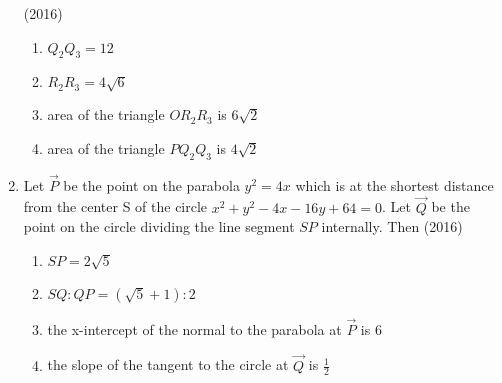 \begin{enumerate}
	      \hfill(2016)
	      
\begin{enumerate}
		      \item $Q_2Q_3=12$
		      \item $R_2R_3=4\sqrt{6}$
		      \item area of the triangle $OR_2R_3$ is $6\sqrt{2}$
		      \item area of the triangle $PQ_2Q_3$ is $4\sqrt{2}$
	       \end{enumerate}
      \item Let $\vec{P}$ be the point on the parabola $y^2=4x$ which is at the shortest distance from the center S of the circle $x^2+y^2-4x-16y+64=0$. Let $\vec{Q}$ be the point on the circle
	      dividing the line segment $SP$ internally. Then 
	      \hfill(2016)
	       \begin{multicols}{2}
\begin{enumerate}
		      \item $SP=2\sqrt{5}$
		      \item $SQ:QP=(\sqrt{5}+1):2$
		      \item the x-intercept of the normal to the parabola at $\vec{P}$ is $6$
		      \item the slope of the tangent to the circle at $\vec{Q}$ is $\frac{1}{2}$
		      

\end{enumerate}
\end{multicols}
\end{enumerate}
